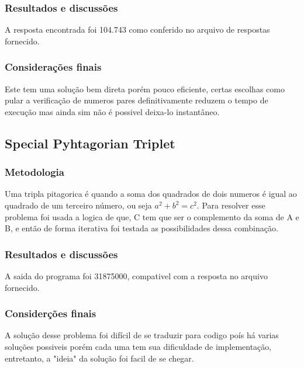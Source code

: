 \documentclass{article}
\begin{document}
        \subsubsection{Resultados e discussões}
        
        A resposta encontrada foi 104.743 como conferido no arquivo de respostas fornecido.
        
        \subsubsection{Considerações finais}
        Este tem uma solução bem direta porém pouco eficiente, certas escolhas como pular a verificação de numeros pares definitivamente reduzem o tempo de execução mas ainda sim não é possivel deixa-lo instantâneo.
        
    \subsection{Special Pyhtagorian Triplet}
        
        \subsubsection{Metodologia}
        Uma tripla pitagorica é quando a soma dos quadrados de dois numeros é igual ao quadrado de um terceiro número, ou seja $a^2+b^2=c^2$. Para resolver esse problema foi usada a logica de que, C tem que ser o complemento da soma de A e B, e então de forma iterativa foi testada as possibilidades dessa combinação.
        
        \subsubsection{Resultados e discussões}
        
        A saida do programa foi 31875000, compativel com a resposta no arquivo fornecido.
        
        \subsubsection{Considerções finais}
        A solução desse problema foi difícil de se traduzir para codigo poís há varias soluções possiveis porém cada uma tem sua dificuldade de implementação, entretanto, a "ideia" da solução foi facil de se chegar.
        
\end{document}
